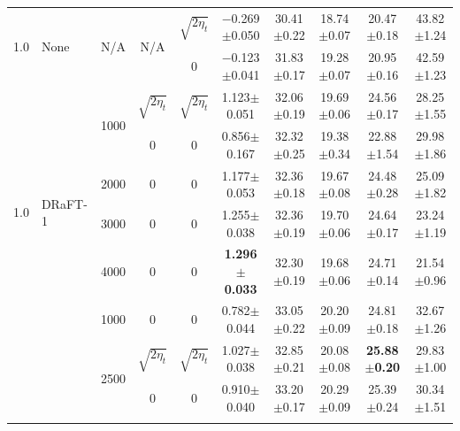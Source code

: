 \begin{table}[h!]
{\begin{tabular}{lllccccccc}
    \midrule
    \multirow{2}{*}{1.0} & \multirow{2}{*}{None} &  \multirow{2}{*}{N/A}        & \multirow{2}{*}{N/A}          & $\sqrt{2 \eta_t}$         & $-$0.269{\tiny$\pm$0.050} & 30.41{\tiny$\pm$0.22} & 18.74{\tiny$\pm$0.07} & 20.47{\tiny$\pm$0.18} & 43.82{\tiny$\pm$1.24} \\
     &  &       &                & 0                 & $-$0.123{\tiny$\pm$0.041} & 31.83{\tiny$\pm$0.17} & 19.28{\tiny$\pm$0.07} & 20.95{\tiny$\pm$0.16} & 42.59{\tiny$\pm$1.23}                             
                                    \\
    \midrule
    \multirow{6}{*}{1.0} & \multirow{6}{*}{DRaFT-1} &  \multirow{2}{*}{1000}        & $\sqrt{2 \eta_t}$          & $\sqrt{2 \eta_t}$         & 1.123{\tiny$\pm$0.051} & 32.06{\tiny$\pm$0.19} & 19.69{\tiny$\pm$0.06} & 24.56{\tiny$\pm$0.17} & 28.25{\tiny$\pm$1.55} \\
     &  &       & 0                 & 0                 & 0.856{\tiny$\pm$0.167} & 32.32{\tiny$\pm$0.25} & 19.38{\tiny$\pm$0.34} & 22.88{\tiny$\pm$1.54} & 29.98{\tiny$\pm$1.86} \\
    \addlinespace
     &  &  2000        & 0                 & 0                 & 1.177{\tiny$\pm$0.053} & 32.36{\tiny$\pm$0.18} & 19.67{\tiny$\pm$0.08} & 24.48{\tiny$\pm$0.28} & 25.09{\tiny$\pm$1.82} \\
    \addlinespace
    & & 3000 & 0                 & 0                 & 1.255{\tiny$\pm$0.038} & 32.36{\tiny$\pm$0.19} & 19.70{\tiny$\pm$0.06} & 24.64{\tiny$\pm$0.17} & 23.24{\tiny$\pm$1.19} \\
    \addlinespace
    & &  4000  & 0 & 0 & \textbf{1.296{\tiny$\pm$0.033}} & 32.30{\tiny$\pm$0.19} & 19.68{\tiny$\pm$0.06} & 24.71{\tiny$\pm$0.14} & 21.54{\tiny$\pm$0.96} \\
    \midrule
    \multirow{5}{*}{1.0} & \multirow{5}{*}{Adj.-Match.} & 1000 & 0                 & 0                 & 0.782{\tiny$\pm$0.044} & 33.05{\tiny$\pm$0.22} & 20.20{\tiny$\pm$0.09} & 24.81{\tiny$\pm$0.18} & 32.67{\tiny$\pm$1.26} \\
    \addlinespace
    & & \multirow{2}{*}{2500} & $\sqrt{2 \eta_t}$ & $\sqrt{2 \eta_t}$ & 1.027{\tiny$\pm$0.038} & 32.85{\tiny$\pm$0.21} & 20.08{\tiny$\pm$0.08} & \textbf{25.88{\tiny$\pm$0.20}} & 29.83{\tiny$\pm$1.00} \\
    & &  & 0 & 0 & 0.910{\tiny$\pm$0.040} & 33.20{\tiny$\pm$0.17} & 20.29{\tiny$\pm$0.09} & 25.39{\tiny$\pm$0.24} & 30.34{\tiny$\pm$1.51} \\
    \addlinespace

\end{tabular}}
\end{table}
